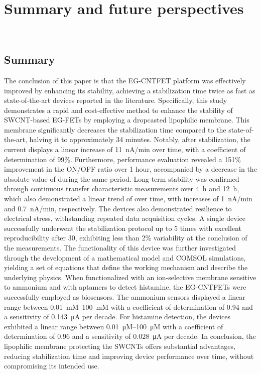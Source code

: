 \chapter{Summary and future perspectives}
\label{Conclusions}
\thispagestyle{empty}

\newpage
\thispagestyle{empty}
\ %
\newpage

\section{Summary}

The conclusion of this paper is that the EG-CNTFET platform was effectively improved by enhancing its stability, achieving a stabilization time twice as fast as state-of-the-art devices reported in the literature. Specifically, this study demonstrates a rapid and cost-effective method to enhance the stability of SWCNT-based EG-FETs by employing a dropcasted lipophilic membrane. This membrane significantly decreases the stabilization time compared to the state-of-the-art, halving it to approximately 34 minutes. Notably, after stabilization, the current displays a linear increase of \SI{11}{\nA/min} over time, with a coefficient of determination of 99\%. Furthermore, performance evaluation revealed a 151\% improvement in the ON/OFF ratio over 1 hour, accompanied by a decrease in the absolute value of \vth{} during the same period. Long-term stability was confirmed through continuous transfer characteristic measurements over \SI{4}{\hour} and \SI{12}{\hour}, which also demonstrated a linear trend of \ids{} over time, with increases of \SI{1}{\nA/min} and \SI{0.7}{\nA/min}, respectively. The devices also demonstrated resilience to electrical stress, withstanding repeated data acquisition cycles. A single device successfully underwent the stabilization protocol up to 5 times with excellent reproducibility after \SI{30}{\min}, exhibiting less than 2\% variability at the conclusion of the measurements. The functionality of this device was further investigated through the development of a mathematical model and COMSOL simulations, yielding a set of equations that define the working mechanism and describe the underlying physics. When functionalized with an ion-selective membrane sensitive to ammonium and with aptamers to detect histamine, the EG-CNTFETs were successfully employed as biosensors. The ammonium sensors displayed a linear range between \SIrange{0.01}{100}{mM} with a coefficient of determination of 0.94 and a sensitivity of \SI{0.143}{\uA} per decade. For histamine detection, the devices exhibited a linear range between \SIrange{0.01}{100}{\micro M} with a coefficient of determination of 0.96 and a sensitivity of \SI{0.028}{\uA} per decade. In conclusion, the lipophilic membrane protecting the SWCNTs offers substantial advantages, reducing stabilization time and improving device performance over time, without compromising its intended use.

